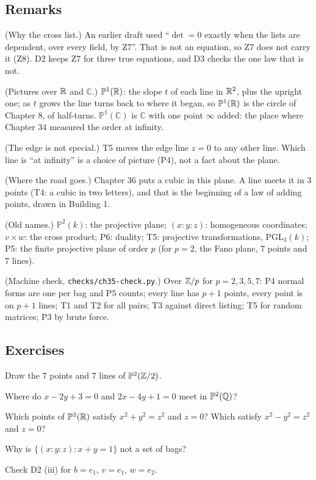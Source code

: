 \subsection*{Remarks}

\begin{lines}
\item[\lab{R1}] (Why the cross list.) An earlier draft used ``$\det = 0$ exactly when the lists are dependent, over every field, by Z7''. That is not an equation, so Z7 does not carry it (Z8). D2 keeps Z7 for three true equations, and D3 checks the one law that is not.
\item[\lab{R2}] (Pictures over $\mathbb{R}$ and $\mathbb{C}$.) $\mathbb{P}^1(\mathbb{R})$: the slope $t$ of each line in $\mathbb{R}^2$, plus the upright one; as $t$ grows the line turns back to where it began, so $\mathbb{P}^1(\mathbb{R})$ is the circle of Chapter 8, of half-turns. $\mathbb{P}^1(\mathbb{C})$ is $\mathbb{C}$ with one point $\infty$ added: the place where Chapter 34 measured the order at infinity.
\item[\lab{R3}] (The edge is not special.) T5 moves the edge line $z = 0$ to any other line. Which line is ``at infinity'' is a choice of picture (P4), not a fact about the plane.
\item[\lab{R4}] (Where the road goes.) Chapter 36 puts a cubic in this plane. A line meets it in $3$ points (T4: a cubic in two letters), and that is the beginning of a law of adding points, drawn in Building 1.
\item[\lab{R5}] (Old names.) $\mathbb{P}^2(k)$: the projective plane; $(x : y : z)$: homogeneous coordinates; $v \times w$: the cross product; P6: duality; T5: projective transformations, $\mathrm{PGL}_3(k)$; P5: the finite projective plane of order $p$ (for $p = 2$, the Fano plane, $7$ points and $7$ lines).
\item[\lab{R6}] (Machine check, \texttt{checks/ch35-check.py}.) Over $\mathbb{Z}/p$ for $p = 2, 3, 5, 7$: P4 normal forms are one per bag and P5 counts; every line has $p + 1$ points, every point is on $p + 1$ lines; T1 and T2 for all pairs; T3 against direct listing; T5 for random matrices; P3 by brute force.
\end{lines}

\subsection*{Exercises}

\begin{lines}
\item[\lab{E1}] Draw the $7$ points and $7$ lines of $\mathbb{P}^2(\mathbb{Z}/2)$.
\item[\lab{E2}] Where do $x - 2y + 3 = 0$ and $2x - 4y + 1 = 0$ meet in $\mathbb{P}^2(\mathbb{Q})$?
\item[\lab{E3}] Which points of $\mathbb{P}^2(\mathbb{R})$ satisfy $x^2 + y^2 = z^2$ and $z = 0$? Which satisfy $x^2 - y^2 = z^2$ and $z = 0$?
\item[\lab{E4}] Why is $\{(x : y : z) : x + y = 1\}$ not a set of bags?
\item[\lab{E5}] Check D2 (iii) for $b = e_1$, $v = e_1$, $w = e_2$.
\end{lines}
\newpage

